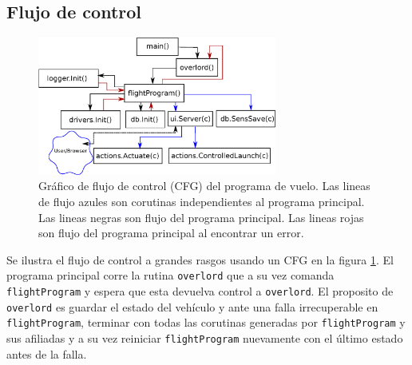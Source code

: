 \subsection{Flujo de control}
\begin{figure}[!htb]
    \centering
    \includegraphics[width=0.7\textwidth]{fig/cfg_flightprogram.eps}
    \caption{Gráfico de flujo de control (CFG) del programa de vuelo. Las lineas de flujo azules son corutinas independientes al programa principal. Las lineas negras son flujo del programa principal. Las lineas rojas son flujo del programa principal al encontrar un error.}
    \label{fig:flightProgram}
\end{figure}

Se ilustra el flujo de control a grandes rasgos usando un CFG en la figura \ref{fig:flightProgram}. El programa principal corre la rutina \texttt{overlord} que a su vez comanda \texttt{flightProgram} y espera que esta devuelva control a \texttt{overlord}. El proposito de \texttt{overlord} es guardar el estado del vehículo y ante una falla irrecuperable en \texttt{flightProgram}, terminar con todas las corutinas generadas por \texttt{flightProgram} y sus afiliadas y a su vez reiniciar \texttt{flightProgram} nuevamente con el último estado antes de la falla.










